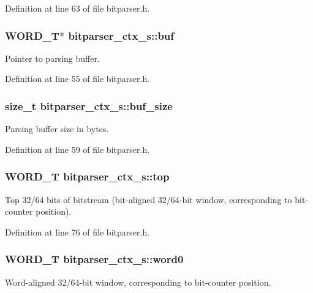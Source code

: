 Definition at line 63 of file bitparser.\+h.

\subsubsection[{\texorpdfstring{buf}{buf}}]{\setlength{\rightskip}{0pt plus 5cm}W\+O\+R\+D\+\_\+T$\ast$ bitparser\+\_\+ctx\+\_\+s\+::buf}\hypertarget{structbitparser__ctx__s_a61880b79e5e1aaea580c77608246bc04}{}\label{structbitparser__ctx__s_a61880b79e5e1aaea580c77608246bc04}
Pointer to parsing buffer. 

Definition at line 55 of file bitparser.\+h.

\subsubsection[{\texorpdfstring{buf\+\_\+size}{buf_size}}]{\setlength{\rightskip}{0pt plus 5cm}size\+\_\+t bitparser\+\_\+ctx\+\_\+s\+::buf\+\_\+size}\hypertarget{structbitparser__ctx__s_a994603de6f9d015a3f20766d9e59afa5}{}\label{structbitparser__ctx__s_a994603de6f9d015a3f20766d9e59afa5}
Parsing buffer size in bytes. 

Definition at line 59 of file bitparser.\+h.

\subsubsection[{\texorpdfstring{top}{top}}]{\setlength{\rightskip}{0pt plus 5cm}W\+O\+R\+D\+\_\+T bitparser\+\_\+ctx\+\_\+s\+::top}\hypertarget{structbitparser__ctx__s_a6143b7f13b53e751b33fde7b77486f34}{}\label{structbitparser__ctx__s_a6143b7f13b53e751b33fde7b77486f34}
Top 32/64 bits of bitstream (bit-\/aligned 32/64-\/bit window, corresponding to bit-\/counter position). 

Definition at line 76 of file bitparser.\+h.

\subsubsection[{\texorpdfstring{word0}{word0}}]{\setlength{\rightskip}{0pt plus 5cm}W\+O\+R\+D\+\_\+T bitparser\+\_\+ctx\+\_\+s\+::word0}\hypertarget{structbitparser__ctx__s_a949e38af43c883fc3dabe70d9085d751}{}\label{structbitparser__ctx__s_a949e38af43c883fc3dabe70d9085d751}
Word-\/aligned 32/64-\/bit window, corresponding to bit-\/counter position. 

